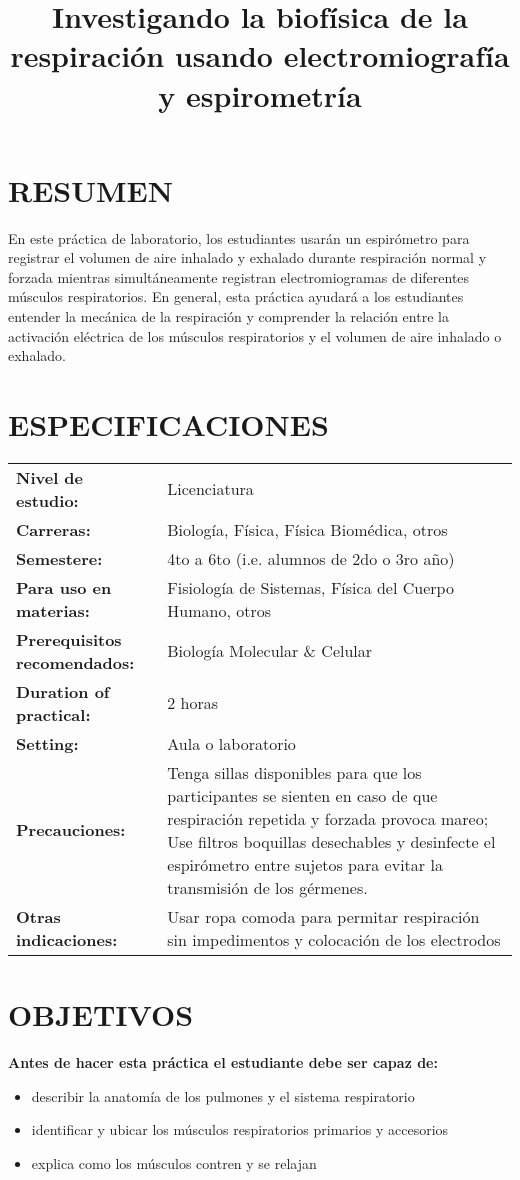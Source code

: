 \documentclass[12pt]{article}
\title{\vspace{-1.8cm}\Large{\textbf{Investigando la biofísica de la
      respiración usando electromiografía y espirometría}}} \author{}
\date{}
\begin{document}
\maketitle

\vspace{-1.4cm}

\section*{RESUMEN}

En este práctica de laboratorio, los estudiantes usarán un espirómetro
para registrar el volumen de aire inhalado y exhalado durante
respiración normal y forzada mientras simultáneamente
registran electromiogramas de diferentes músculos respiratorios. En
general, esta práctica ayudará a los estudiantes entender la mecánica
de la respiración y comprender la relación entre la activación
eléctrica de los músculos respiratorios y el volumen de aire inhalado
o exhalado.

\section*{ESPECIFICACIONES}
\begin{tabular}{p{6cm} p{10cm}}
\textbf{Nivel de estudio:} & Licenciatura \\
\textbf{Carreras:} & Biología, Física, Física Biomédica, otros \\
\textbf{Semestere:} & 4to a 6to (i.e. alumnos de 2do o 3ro año) \\ 
\textbf{Para uso en materias:} & Fisiología de Sistemas, Física del Cuerpo Humano, otros \\
\textbf{Prerequisitos recomendados:} & Biología Molecular \& Celular \\
\textbf{Duration of practical:} & 2 horas \\
\textbf{Setting:} & Aula o laboratorio \\
\textbf{Precauciones:} & Tenga sillas disponibles para que los participantes se sienten en caso de que respiración repetida y forzada provoca mareo; Use filtros boquillas desechables y desinfecte el espirómetro entre sujetos para evitar la transmisión de los gérmenes. \\
\textbf{Otras indicaciones:} & Usar ropa comoda para permitar respiración sin impedimentos y colocación de los electrodos
\end{tabular}

\section*{OBJETIVOS}
\textbf{Antes de hacer esta práctica el estudiante debe ser capaz de:}
\begin{itemize}
\item describir la anatomía de los pulmones y el sistema respiratorio
\item identificar y ubicar los músculos respiratorios primarios y accesorios
\item explica como los músculos contren y se relajan
\end{itemize}
 
\end{document}
